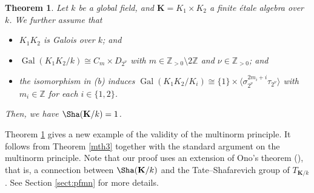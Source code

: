 \documentclass[12pt]{amsart}
\theoremstyle{plain}
\newtheorem{thm}{Theorem}[section]
\theoremstyle{definition}
\numberwithin{thm}{section}
\numberwithin{equation}{section}
\newcommand{\Zpn}{\mathbb{Z}_{>0}}
\newcommand{\Z}{\mathbb{Z}}
\newcommand{\Q}{\mathbb{Q}}
\newcommand{\bK}{\mathbf{K}}
\DeclareMathOperator{\Ker}{Ker}
\DeclareMathOperator{\Hom}{Hom}
\DeclareMathOperator{\Gal}{Gal}
\DeclareMathOperator{\Res}{Res}
\DeclareMathOperator{\Pic}{Pic}
\DeclareMathOperator{\sep}{sep}
\begin{document}
\begin{thm}\label{mth5}
Let $k$ be a global field, and $\bK=K_{1}\times K_{2}$ a finite {\'e}tale algebra over $k$. We further assume that
\begin{itemize}
\item[(a)] $K_{1}K_{2}$ is Galois over $k$; and
\item[(b)] $\Gal(K_{1}K_{2}/k)\cong C_{m}\times D_{2^{\nu}}$ with $m\in \Zpn \setminus 2\Z$ and $\nu\in \Zpn$; and
\item[(c)] the isomorphism in \emph{(b)} induces $\Gal(K_{1}K_{2}/K_{i})\cong \{1\}\times \langle \sigma_{2^{\nu}}^{2m_{i}+i}\tau_{2^{\nu}}\rangle$ with $m_{i}\in \Z$ for each $i\in \{1,2\}$. 
\end{itemize}
Then, we have $\Sha(\bK/k)=1$. 
\end{thm}

Theorem \ref{mth5} gives a new example of the validity of the multinorm principle. It follows from Theorem \ref{mth3} together with the standard argument on the multinorm principle. Note that our proof uses an extension of Ono's theorem (\cite{Ono1963}), that is, a connection between $\Sha(\bK/k)$ and the Tate--Shafarevich group of $T_{\bK/k}$. 
See Section \ref{sect:pfmn} for more details. 

\end{document}
